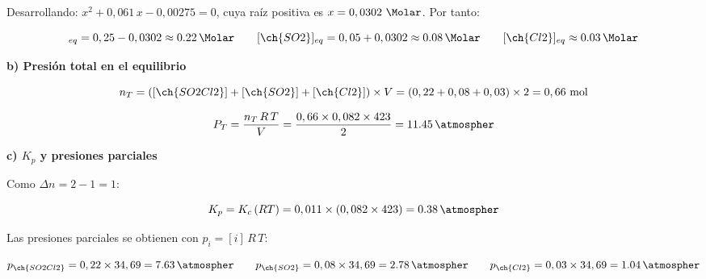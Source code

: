 \begin{exerciseEVAU}
\begin{solu}
        Desarrollando: \(x^2 + 0,061\, x - 0,00275 = 0\), cuya raíz positiva es \(x = 0,0302\ \si{\Molar}\). Por tanto:

        \begin{equation*}
            [\ch{SO2Cl2}]_{eq} = 0,25 - 0,0302 \approx \SI{0.22}{\Molar} \qquad [\ch{SO2}]_{eq} = 0,05 + 0,0302 \approx \SI{0.08}{\Molar} \qquad [\ch{Cl2}]_{eq} \approx \SI{0.03}{\Molar}
        \end{equation*}

        \textbf{b) Presión total en el equilibrio}

        \begin{equation*}
            n_T = ([\ch{SO2Cl2}]+[\ch{SO2}]+[\ch{Cl2}]) \times V = (0,22+0,08+0,03) \times 2 = 0,66 \ \text{mol}
        \end{equation*}

        \begin{equation*}
            P_T = \dfrac{n_T\, R\, T}{V} = \dfrac{0,66 \times 0,082 \times 423}{2} = \SI{11.45}{\atmospher}
        \end{equation*}

        \textbf{c) \(K_p\) y presiones parciales}

        Como \(\Delta n = 2-1 = 1\):

        \begin{equation*}
            K_p = K_c\, (RT) = 0,011 \times (0,082 \times 423) = \SI{0.38}{\atmospher}
        \end{equation*}

        Las presiones parciales se obtienen con \(p_i = [i]\, R\, T\):

        \begin{equation*}
            p_{\ch{SO2Cl2}} = 0,22 \times 34,69 = \SI{7.63}{\atmospher} \qquad p_{\ch{SO2}} = 0,08 \times 34,69 = \SI{2.78}{\atmospher} \qquad p_{\ch{Cl2}} = 0,03 \times 34,69 = \SI{1.04}{\atmospher}
        \end{equation*}

    \end{solu}

\end{exerciseEVAU}

